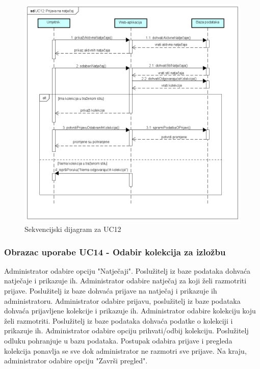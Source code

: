 		\begin{figure}[H]
			
			\includegraphics[width=\textwidth,height=\textheight,keepaspectratio]{sd_uc12}
			\caption{Sekvencijski dijagram za UC12}
			
		\end{figure}
		\eject
		
		\subsubsection{Obrazac uporabe UC14 - Odabir kolekcija za izložbu}
		
		{Administrator odabire opciju "Natječaji". Poslužitelj iz baze podataka dohvaća natječaje i prikazuje ih.
			Administrator odabire natječaj za koji želi razmotriti prijave. Poslužitelj iz baze dohvaća prijave na natječaj
			i prikazuje ih administratoru. Administrator odabire prijavu, poslužitelj iz baze podataka dohvaća prijavljene kolekcije
			i prikazuje ih. Administrator odabire kolekciju koju želi razmotriti. Poslužitelj iz baze podataka dohvaća podatke o kolekciji i prikazuje ih. Administrator odabire opciju prihvati/odbij kolekciju. Poslužitelj odluku pohranjuje u bazu podataka. Postupak odabira prijave i pregleda kolekcija ponavlja se sve dok administrator ne razmotri sve prijave. Na kraju, administrator odabire opciju "Završi pregled". }
		
